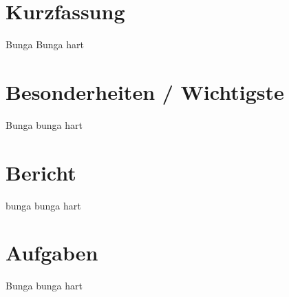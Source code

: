 \documentclass[9pt,twoside]{article}                  %
\begin{document}
\section*{Kurzfassung}
\begin{Sbox}                                          %
  \begin{minipage}{\textwidth}                        %
    Bunga Bunga hart \\
  \end{minipage}
\end{Sbox}
\fbox{\TheSbox}                                       %
\vspace{1cm}                                          %

\section*{Besonderheiten / Wichtigste}
\begin{Sbox}
  \begin{minipage}{\textwidth}
    Bunga bunga hart \\
  \end{minipage}
\end{Sbox}
\doublebox{\TheSbox}                                  %
\vspace{1cm}

\section*{Bericht}
\begin{Sbox}
  \begin{minipage}{\textwidth}
    bunga bunga hart \\ 
  \end{minipage}
\end{Sbox}
\fbox{\TheSbox}
\vspace{1cm}

\newpage                                              %
\section*{Aufgaben}
\begin{Sbox}
  \begin{minipage}{\textwidth}
    Bunga bunga hart \\
  \end{minipage}
\end{Sbox}
\doublebox{\TheSbox}

\end{document}
